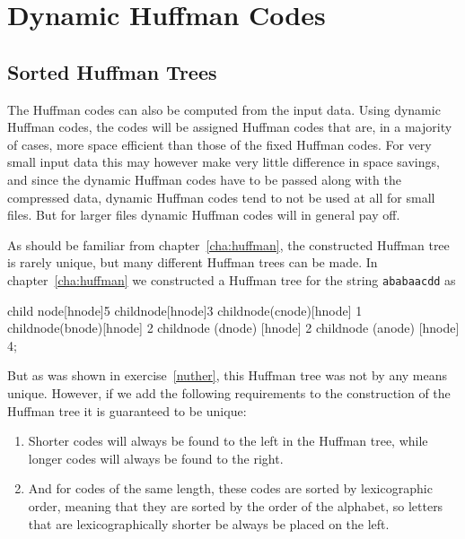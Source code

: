 \section{Dynamic Huffman Codes}
\label{sec:dynamic-huffman-codes}

\subsection{Sorted Huffman Trees}

The Huffman codes can also be computed from the input data. Using
dynamic Huffman codes, the codes will be assigned Huffman codes that
are, in a majority of cases, more space efficient than those of the
fixed Huffman codes. For very small input data this may however make
very little difference in space savings, and since the dynamic Huffman
codes have to be passed along with the compressed data, dynamic
Huffman codes tend to not be used at all for small files. But for
larger files dynamic Huffman codes will in general pay off.

As should be familiar from chapter~\ref{cha:huffman}, the constructed
Huffman tree is rarely unique, but many different Huffman trees can be
made. In chapter~\ref{cha:huffman} we constructed a Huffman tree for
the string \texttt{ababaacdd} as

\begin{huffmanc}
  child {node[hnode]{5}
    child{node[hnode]{3}
      child{node(cnode)[hnode] {1}}
      child{node(bnode)[hnode] {2}}}
    child{node (dnode) [hnode] {2}}}
  child{node (anode) [hnode] {4}};

\end{huffmanc}

But as was shown in exercise~\ref{nuther}, this Huffman tree was not
by any means unique. However, if we add the following requirements to
the construction of the Huffman tree it is guaranteed to be unique:

\begin{enumerate}
\item Shorter codes will always be found to the left in the Huffman
  tree, while longer codes will always be found to the right.
\item And for codes of the same length, these codes are sorted by
  lexicographic order, meaning that they are sorted by the order of the
  alphabet, so letters that are lexicographically shorter be always be
  placed on the left.
\end{enumerate}


